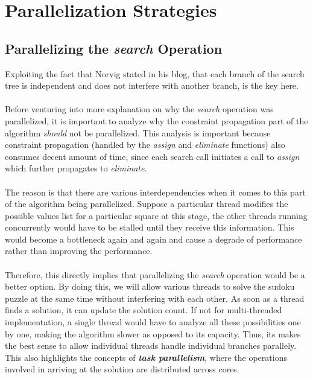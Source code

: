 \documentclass[a4paper,10pt,twoside]{article}
\begin{document}
\section{Parallelization Strategies}


\subsection{Parallelizing the \textit{search} Operation}
Exploiting the fact that Norvig stated in his blog, that each branch of the search tree is independent and does not interfere with another branch, is the key here\cite{chiu2012}.\\ \\
Before venturing into more explanation on why the \textit{search} operation was parallelized, it is important to analyze why the constraint propagation part of the algorithm \textit{should} not be parallelized. This analysis is important because constraint propagation (handled by the \textit{assign} and \textit{eliminate} functions) also consumes decent amount of time, since each search call initiates a call to \textit{assign} which further propagates to \textit{eliminate}.\\ \\
The reason is that there are various interdependencies when it comes to this part of the algorithm being parallelized. Suppose a particular thread modifies the possible values list for a particular square at this stage, the other threads running concurrently would have to be stalled until they receive this information. This would become a bottleneck again and again and cause a degrade of performance rather than improving the performance.\\ \\
Therefore, this directly implies that parallelizing the \textit{search} operation would be a better option. By doing this, we will allow various threads to solve the sudoku puzzle at the same time without interfering with each other. As soon as a thread finds a solution, it
can update the solution count. If not for multi-threaded implementation, a single thread would have to analyze all these possibilities one by one, making the algorithm slower as opposed to its capacity. Thus, its makes the best sense to allow individual threads handle individual branches parallely. This also highlights the concepts of \textbf{\textit{task parallelism}}, where the operations involved in arriving at the solution are distributed across cores.\\ \\
\end{document}
